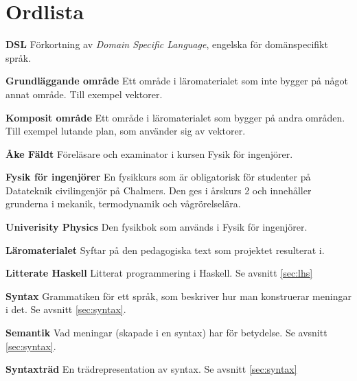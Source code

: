 
\chapter*{Ordlista}


\textbf{DSL} Förkortning av \textit{Domain Specific Language}, engelska för domänspecifikt språk.

\textbf{Grundläggande område} Ett område i läromaterialet som inte bygger på något annat område. Till exempel vektorer.

\textbf{Komposit område} Ett område i läromaterialet som bygger på andra områden. Till exempel lutande plan, som använder sig av vektorer.

\textbf{Åke Fäldt} Föreläsare och examinator i kursen Fysik för ingenjörer.

\textbf{Fysik för ingenjörer} En fysikkurs som är obligatorisk för studenter på Datateknik civilingenjör på Chalmers. Den ges i årskurs 2 och innehåller grunderna i mekanik, termodynamik och vågrörelselära.

\textbf{Univerisity Physics} Den fysikbok som används i Fysik för ingenjörer.

\textbf{Läromaterialet} Syftar på den pedagogiska text som projektet resulterat i.

\textbf{Litterate Haskell} Litterat programmering i Haskell. Se avsnitt \ref{sec:lhs}

\textbf{Syntax} Grammatiken för ett språk, som beskriver hur man konstruerar meningar i det. Se avsnitt \ref{sec:syntax}.

\textbf{Semantik} Vad meningar (skapade i en syntax) har för betydelse. Se avsnitt \ref{sec:syntax}.

\textbf{Syntaxträd} En trädrepresentation av syntax. Se avsnitt \ref{sec:syntax}














